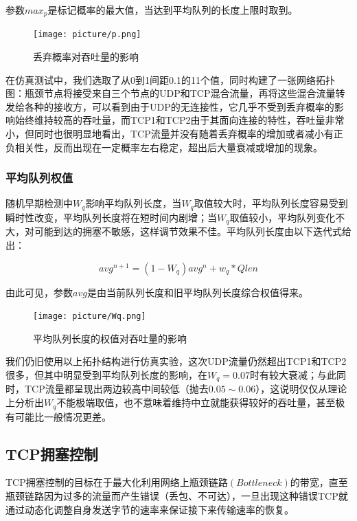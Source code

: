 \documentclass{article}
\begin{document}
参数$max_p$是标记概率的最大值，当达到平均队列的长度上限时取到。

\begin{figure}[H]
	\centering
	\texttt{[image: picture/p.png]}
	\caption{丢弃概率对吞吐量的影响}
	\label{fig:p}
\end{figure}

在仿真测试中，我们选取了从0到1间距0.1的11个值，同时构建了一张网络拓扑图：瓶颈节点将接受来自三个节点的UDP和TCP混合流量，再将这些混合流量转发给各种的接收方，可以看到由于UDP的无连接性，它几乎不受到丢弃概率的影响始终维持较高的吞吐量，而TCP1和TCP2由于其面向连接的特性，吞吐量非常小，但同时也很明显地看出，TCP流量并没有随着丢弃概率的增加或者减小有正负相关性，反而出现在一定概率左右稳定，超出后大量衰减或增加的现象。

\subsubsection{平均队列权值}

随机早期检测中$W_q$影响平均队列长度，当$W_q$取值较大时，平均队列长度容易受到瞬时性改变，平均队列长度将在短时间内剧增；当$W_q$取值较小，平均队列变化不大，对可能到达的拥塞不敏感，这样调节效果不佳。平均队列长度由以下迭代式给出：

\begin{equation}
	avg^{n+1}=(1-W_q)avg^{n}+w_q*Qlen
\end{equation}

由此可见，参数$avg$是由当前队列长度和旧平均队列长度综合权值得来。

\begin{figure}[H]
	\centering
	\texttt{[image: picture/Wq.png]}
	\caption{平均队列长度的权值对吞吐量的影响}
	\label{fig:Wq}
\end{figure}

我们仍旧使用以上拓扑结构进行仿真实验，这次UDP流量仍然超出TCP1和TCP2很多，但其中明显受到平均队列长度的影响，在$W_q=0.07$时有较大衰减；与此同时，TCP流量都呈现出两边较高中间较低（抛去$0.05 \sim 0.06$），这说明仅仅从理论上分析出$W_q$不能极端取值，也不意味着维持中立就能获得较好的吞吐量，甚至极有可能比一般情况更差。

\subsection{TCP拥塞控制}

TCP拥塞控制的目标在于最大化利用网络上瓶颈链路$(Bottleneck)$的带宽，直至瓶颈链路因为过多的流量而产生错误（丢包、不可达），一旦出现这种错误TCP就通过动态化调整自身发送字节的速率来保证接下来传输速率的恢复。
\end{document}
